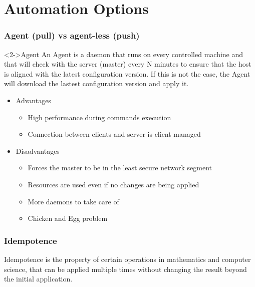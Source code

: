\documentclass[t,aspectratio=169]{beamer}
\begin{document}
\section{Automation Options}
\begin{frame}
    \frametitle{Agent (pull) vs agent-less (push)}
    \begin{block}<2->{Agent}
    An Agent is a daemon that runs on every controlled machine and that will check with the server (master) every N minutes to ensure that the host is aligned with the latest configuration version. If this is not the case, the Agent will download the lastest configuration version and apply it.
    \end{block}
    \begin{itemize}
        \item<3-> Advantages
        \begin{itemize}
            \item<4-> High performance during commands execution
            \item<5-> Connection between clients and server is client managed
        \end{itemize}
        \item<6-> Disadvantages
        \begin{itemize}
            \item<7-> Forces the master to be in the least secure network segment
            \item<8-> Resources are used even if no changes are being applied
            \item<9-> More daemons to take care of
            \item<10-> Chicken and Egg problem 
        \end{itemize}
    \end{itemize}
\end{frame}

\begin{frame}
    \frametitle{Idempotence}
    \begin{definition}{Idempotence}
    is the property of certain operations in mathematics and computer science, that can be applied multiple times without changing the result beyond the initial application. 
    \end{definition}
\end{frame}
\end{document}
